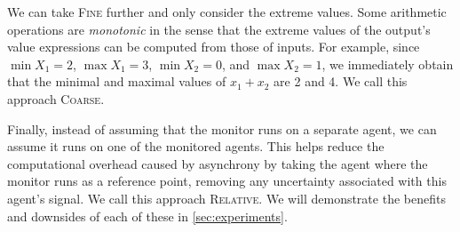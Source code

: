 We can take \textsc{Fine} further and only consider the extreme values.
Some arithmetic operations are \emph{monotonic} in the sense that the extreme values of the output's value expressions can be computed from those of inputs.
For example, since $\min X_1 = 2$, $\max X_1 = 3$, $\min X_2 = 0$, and $\max X_2 = 1$, we immediately obtain that the minimal and maximal values of $x_1 + x_2$ are 2 and 4.
We call this approach \textsc{Coarse}.

Finally, instead of assuming that the monitor runs on a separate agent, we can assume it runs on one of the monitored agents.
This helps reduce the computational overhead caused by asynchrony by taking the agent where the monitor runs as a reference point, removing any uncertainty associated with this agent's signal.
We call this approach \textsc{Relative}.
We will demonstrate the benefits and downsides of each of these in \cref{sec:experiments}.